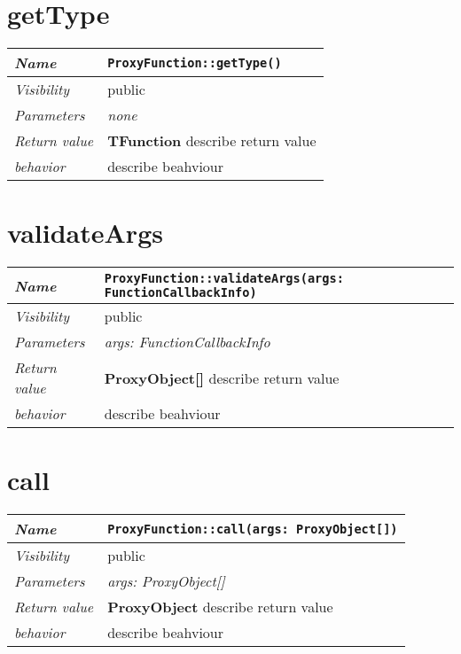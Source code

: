  \section{getType}
\begin{longtable}{p{3cm} @{\hskip 1cm} p{12cm}}
 \hline
\textit{Name} & \texttt{ProxyFunction::getType()}\\
\hline
 \textit{Visibility} & public\\
\hline
\textit{Parameters} & \textit{none}\\
\hline
\textit{Return value} & \textbf{ TFunction} describe return value\\
  \hline
 \textit{behavior} & describe beahviour \\
\hline
\end{longtable} \pagebreak
 \section{validateArgs}
\begin{longtable}{p{3cm} @{\hskip 1cm} p{12cm}}
 \hline
\textit{Name} & \texttt{ProxyFunction::validateArgs(args: FunctionCallbackInfo)}\\
\hline
 \textit{Visibility} & public\\
\hline
\textit{Parameters} & \textit{args: FunctionCallbackInfo}\\
\hline
\textit{Return value} & \textbf{ ProxyObject[]} describe return value\\
  \hline
 \textit{behavior} & describe beahviour \\
\hline
\end{longtable} \pagebreak
 \section{call}
\begin{longtable}{p{3cm} @{\hskip 1cm} p{12cm}}
 \hline
\textit{Name} & \texttt{ProxyFunction::call(args: ProxyObject[])}\\
\hline
 \textit{Visibility} & public\\
\hline
\textit{Parameters} & \textit{args: ProxyObject[]}\\
\hline
\textit{Return value} & \textbf{ ProxyObject} describe return value\\
  \hline
 \textit{behavior} & describe beahviour \\
\hline
\end{longtable} \pagebreak
 